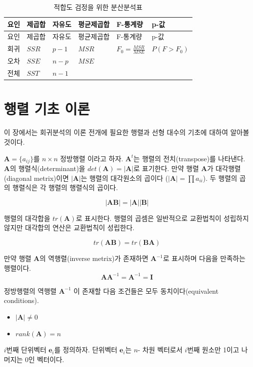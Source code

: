 \documentclass[
]{book}
\providecommand{\tightlist}{%
  \setlength{\itemsep}{0pt}\setlength{\parskip}{0pt}}
\theoremstyle{definition}
\theoremstyle{definition}
\theoremstyle{definition}
\theoremstyle{remark}
\begin{document}
\begin{longtable}[]{@{}llllll@{}}
\caption{적합도 검정을 위한 분산분석표}\tabularnewline
\toprule
요인 & 제곱합 & 자유도 & 평균제곱합 & F-통계량 & p-값\tabularnewline
\midrule
\endfirsthead
\toprule
요인 & 제곱합 & 자유도 & 평균제곱합 & F-통계량 & p-값\tabularnewline
\midrule
\endhead
회귀 & \(SSR\) & \(p-1\) & \(MSR\) & \(F_0 =\frac{MSR}{MSE}\) & \(P(F>F_0)\)\tabularnewline
오차 & \(SSE\) & \(n-p\) & \(MSE\) & &\tabularnewline
전체 & \(SST\) & \(n-1\) & & &\tabularnewline
\bottomrule
\end{longtable}

\hypertarget{appendix-appendix}{%
\appendix {}}


\hypertarget{matalgebra}{%
\chapter{행렬 기초 이론}\label{matalgebra}}

이 장에서는 회귀분석의 이론 전개에 필요한 행렬과 선형 대수의 기초에 대하여 알아볼 것이다.

\(\bm A = \{ a_{ij} \}\)를 \(n \times n\) 정방행렬 이라고 하자. \(\bm A^t\)는 행렬의 전치(transpose)를 나타낸다. \(\bm A\)의 행렬식(determinant)을 \(det(\bm A)=|\bm A|\)로 표기한다. 만약 행렬 \(\bm A\)가 대각행렬(diagonal metrix)이면 \(|\bm A|\)는 행렬의 대각원소의 곱이다 (\(| \bm A| =\prod a_{ii}\)). 두 행렬의 곱의 행렬식은 각 행렬의 행렬식의 곱이다.

\[ |\bm A \bm B | = | \bm A| |\bm B| \]

행렬의 대각합을 \(tr(\bm A)\)로 표시한다. 행렬의 곱셈은 일반적으로 교환법칙이 성립하지 않지만 대각합의 연산은 교환법칙이 성립한다.

\[  tr(\bm A \bm B)  = tr( \bm B \bm A) \]

만약 행렬 \(\bm A\)의 역행렬(inverse metrix)가 존재하면 \(\bm A^{-1}\)로 표시하며 다음을 만족하는 행렬이다.
\[ \bm A \bm A^{-1} = \bm A^{-1} = \bm I \]

정방행렬의 역행렬 \(\bm A^{-1}\) 이 존재할 다음 조건들은 모두 동치이다(equivalent conditions).

\begin{itemize}
\tightlist
\item
  \(|\bm A| \ne 0\)
\item
  \(rank(\bm A) = n\)
\end{itemize}

\(i\)번째 단위벡터 \(\bm e_i\)를 정의하자. 단위벡터 \(\bm e_i\)는 \(n\)- 차원 벡터로서 \(i\)번째 원소만 1이고 나머지는 0인 벡터이다.
\end{document}
